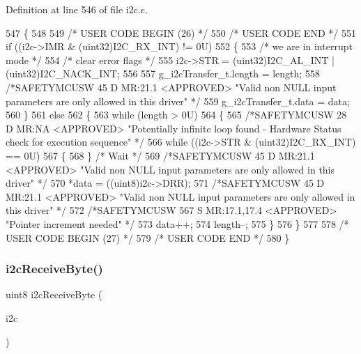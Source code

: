 Definition at line 546 of file i2c.\+c.


\begin{DoxyCode}
547 \{
548 
549 \textcolor{comment}{/* USER CODE BEGIN (26) */}
550 \textcolor{comment}{/* USER CODE END */}
551     \textcolor{keywordflow}{if} ((i2c->IMR & (uint32)I2C\_RX\_INT) != 0U)
552     \{
553         \textcolor{comment}{/* we are in interrupt mode */}
554         \textcolor{comment}{/* clear error flags */}
555         i2c->STR = (uint32)I2C\_AL\_INT | (uint32)I2C\_NACK\_INT;
556 
557         g\_i2cTransfer\_t.length = length;
558         \textcolor{comment}{/*SAFETYMCUSW 45 D MR:21.1 <APPROVED> "Valid non NULL input parameters are only allowed in this
       driver" */}
559         g\_i2cTransfer\_t.data   = data;
560     \}
561     \textcolor{keywordflow}{else}
562     \{
563         \textcolor{keywordflow}{while} (length > 0U)
564         \{
565             \textcolor{comment}{/*SAFETYMCUSW 28 D MR:NA <APPROVED> "Potentially infinite loop found - Hardware Status check
       for execution sequence" */}
566             \textcolor{keywordflow}{while} ((i2c->STR & (uint32)I2C\_RX\_INT) == 0U)
567             \{
568             \} \textcolor{comment}{/* Wait */}
569             \textcolor{comment}{/*SAFETYMCUSW 45 D MR:21.1 <APPROVED> "Valid non NULL input parameters are only allowed in this
       driver" */}
570             *data = ((uint8)i2c->DRR);
571             \textcolor{comment}{/*SAFETYMCUSW 45 D MR:21.1 <APPROVED> "Valid non NULL input parameters are only allowed in this
       driver" */}
572             \textcolor{comment}{/*SAFETYMCUSW 567 S MR:17.1,17.4 <APPROVED> "Pointer increment needed" */}
573             data++;
574             length--;
575         \}
576     \}
577 
578 \textcolor{comment}{/* USER CODE BEGIN (27) */}
579 \textcolor{comment}{/* USER CODE END */}
580 \}
\end{DoxyCode}
\mbox{\label{group__I2C_gad48630f360b59984accf504f463e19ab}} 
\subsubsection{\texorpdfstring{i2c\+Receive\+Byte()}{i2cReceiveByte()}}
{\footnotesize\ttfamily uint8 i2c\+Receive\+Byte (\begin{DoxyParamCaption}\item[{\mbox{\hyperlink{reg__i2c_8h_a5d6c119fb20e803a530d0d4df544daf7}{i2c\+B\+A\+S\+E\+\_\+t}} $\ast$}]{i2c }\end{DoxyParamCaption})}



